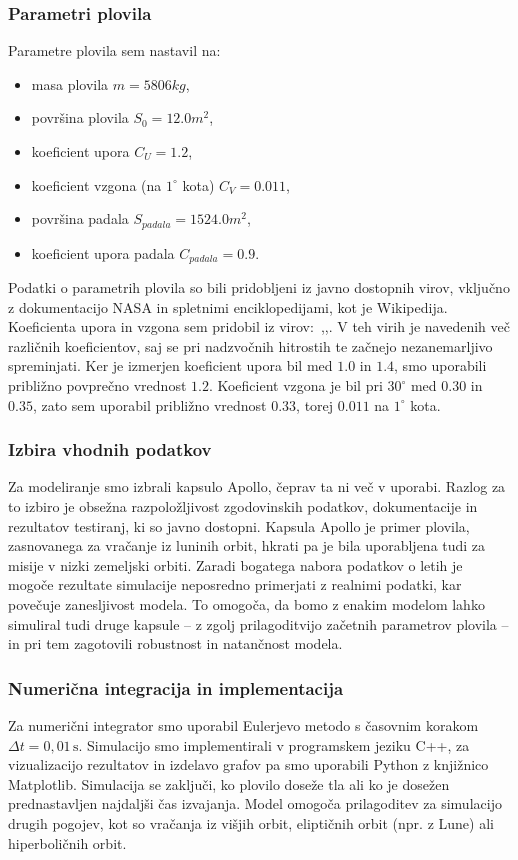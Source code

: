 \documentclass[a4paper,12pt]{article}
\begin{document}
    \subsubsection{Parametri plovila}
    Parametre plovila sem nastavil na:
    \begin{itemize}
        \item masa plovila $m = 5806 kg$,
        \item površina plovila $S_0 = 12.0 m^2$,
        \item koeficient upora $C_U = 1.2$,
        \item koeficient vzgona (na $1^\circ$ kota) $C_V = 0.011$,
        \item površina padala $S_{padala} = 1524.0 m^2$,
        \item koeficient upora padala $C_{padala} = 0.9$.

    \end{itemize}
    Podatki o parametrih plovila so bili pridobljeni iz javno dostopnih virov, vključno z dokumentacijo NASA in spletnimi enciklopedijami, kot je Wikipedija.
    Koeficienta upora in vzgona sem pridobil iz virov:~\cite{fig:vir3},\cite{fig:vir4},\cite{fig:vir6}.
    V teh virih je navedenih več različnih koeficientov, saj se pri nadzvočnih hitrostih te začnejo nezanemarljivo spreminjati.
    Ker je izmerjen koeficient upora bil med $1.0$ in $1.4$, smo uporabili približno povprečno vrednost $1.2$.
    Koeficient vzgona je bil pri $30^\circ$ med $0.30$ in $0.35$, zato sem uporabil približno vrednost $0.33$, torej $0.011$ na $1^\circ$ kota.


    \subsubsection{Izbira vhodnih podatkov}
    Za modeliranje smo izbrali kapsulo Apollo, čeprav ta ni več v uporabi.
    Razlog za to izbiro je obsežna razpoložljivost zgodovinskih podatkov, dokumentacije in rezultatov testiranj, ki so javno dostopni.
    Kapsula Apollo je primer plovila, zasnovanega za vračanje iz luninih orbit, hkrati pa je bila uporabljena tudi za misije v nizki zemeljski orbiti.
    Zaradi bogatega nabora podatkov o letih je mogoče rezultate simulacije neposredno primerjati z realnimi podatki, kar povečuje zanesljivost modela.
    To omogoča, da bomo z enakim modelom lahko simuliral tudi druge kapsule – z zgolj prilagoditvijo začetnih parametrov plovila – in pri tem zagotovili robustnost in natančnost modela.

    \subsubsection{Numerična integracija in implementacija}
    Za numerični integrator smo uporabil Eulerjevo metodo s časovnim korakom $\Delta t = 0,01 \, \text{s}$.
    Simulacijo smo implementirali v programskem jeziku C++, za vizualizacijo rezultatov in izdelavo grafov pa smo uporabili Python z knjižnico Matplotlib.
    Simulacija se zaključi, ko plovilo doseže tla ali ko je dosežen prednastavljen najdaljši čas izvajanja.
    Model omogoča prilagoditev za simulacijo drugih pogojev, kot so vračanja iz višjih orbit, eliptičnih orbit (npr. z Lune) ali hiperboličnih orbit.
\end{document}
